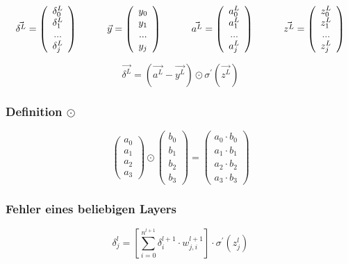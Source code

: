 \documentclass{article}
\begin{document}
\[ \vec{\delta^L} = \left( \begin{array}{c}
     \delta_0^L \\ \delta_1^L \\ ... \\ \delta_j^L 
\end{array} \right)
\kern 30pt
\vec{y} = \left( \begin{array} {c}
    y_0 \\ y_1 \\ ... \\ y_j
\end{array} \right) 
\kern 30pt
\vec{a^L} = \left(\begin{array}{c}
    a_0^L \\ a_1^L \\ ... \\ a_j^L
\end{array} \right) 
\kern 30pt
\vec{z^L} = \left(\begin{array}{c}
    z_0^L \\ z_1^L \\ ... \\ z_j^L
\end{array} \right) 
\]

\[ \vec{\delta^L} = (\vec{a^L} - \vec{y^L}) \odot \sigma^{\prime}(\vec{z^L}) \]


\subsubsection{Definition $\odot$}
\[ \left(\begin{array}{c}
    a_0 \\ a_1 \\ a_2 \\ a_3
\end{array}\right)
\odot \left(\begin{array}{c}
    b_0 \\ b_1 \\ b_2 \\ b_3
\end{array}\right) 
= \left(\begin{array}{c}
    a_0 \cdot b_0 \\ a_1 \cdot b_1 \\ a_2 \cdot b_2 \\ a_3 \cdot b_3
\end{array}\right) \]

\pagebreak
\subsubsection{Fehler eines beliebigen Layers}
\[ \delta_j^{l} = [\sum_{i = 0}^{n^{l+1}} \delta_i^{l+1} \cdot w_{j,i}^{l+1}] \cdot \sigma^{\prime}(z_j^{l})  \]
\end{document}
